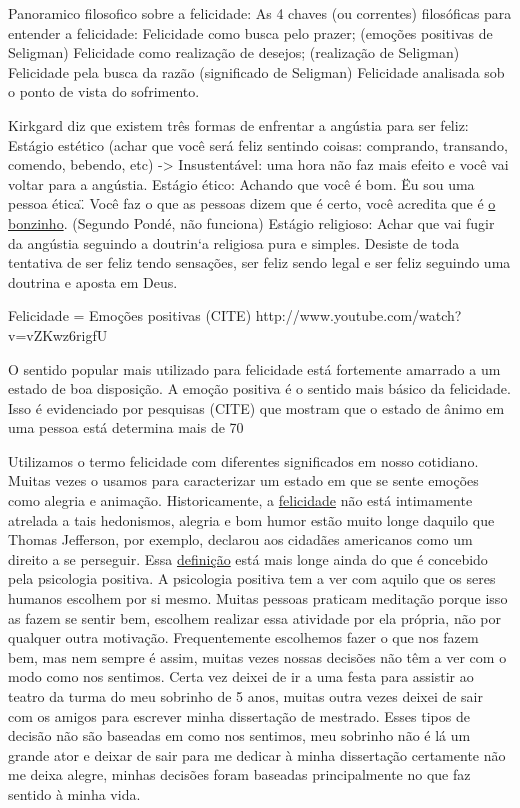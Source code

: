 Panoramico filosofico sobre a felicidade:
As 4 chaves (ou correntes) filosóficas para entender a felicidade:
Felicidade como busca pelo prazer; (emoções positivas de Seligman)
Felicidade como realização de desejos; (realização de Seligman)
Felicidade pela busca da razão (significado de Seligman)
Felicidade analisada sob o ponto de vista do sofrimento.

Kirkgard diz que existem três formas de enfrentar a angústia para ser feliz:
Estágio estético (achar que você será feliz sentindo coisas: comprando, transando, comendo, bebendo, etc) -> Insustentável: uma hora  não faz mais efeito e você vai voltar para a angústia.
Estágio ético: Achando que você é bom. \"Eu sou uma pessoa ética\". Você faz o que as pessoas dizem que é certo, você acredita que é \underline{o bonzinho}. (Segundo Pondé, não funciona)
Estágio religioso:
Achar que vai fugir da angústia seguindo a doutrin`a religiosa pura e simples.
Desiste de toda tentativa de ser feliz tendo sensações, ser feliz sendo legal e ser feliz seguindo uma doutrina e aposta em Deus.

Felicidade = Emoções positivas (CITE) http://www.youtube.com/watch?v=vZKwz6rigfU

O sentido popular mais utilizado para felicidade está fortemente amarrado a um estado de boa disposição. A emoção positiva é o sentido mais básico da felicidade. Isso é evidenciado por pesquisas (CITE) que mostram que o estado de ânimo em uma pessoa está determina mais de 70%

Utilizamos o termo felicidade com diferentes significados em nosso cotidiano. Muitas vezes o usamos para caracterizar um estado em que se sente emoções como alegria e animação. Historicamente, a \underline{felicidade} não está intimamente atrelada a tais hedonismos, alegria e bom humor estão muito longe daquilo que Thomas Jefferson, por exemplo, declarou aos cidadães americanos como um direito a se perseguir. Essa \underline{definição} está mais longe ainda do que é concebido pela psicologia positiva. A psicologia positiva tem a ver com aquilo que os seres humanos escolhem por si mesmo. Muitas pessoas praticam meditação porque isso as fazem se sentir bem, escolhem realizar essa atividade por ela própria, não por qualquer outra motivação. Frequentemente escolhemos fazer o que nos fazem bem, mas nem sempre é assim, muitas vezes nossas decisões não têm a ver com o modo como nos sentimos. Certa vez deixei de ir a uma festa para assistir ao teatro da turma do meu sobrinho de 5 anos, muitas outra vezes deixei de sair com os amigos para escrever minha dissertação de mestrado. Esses tipos de decisão não são baseadas em como nos sentimos, meu sobrinho não é lá um grande ator e deixar de sair para me dedicar à minha dissertação certamente não me deixa alegre, minhas decisões foram baseadas principalmente no que faz sentido à minha vida.

